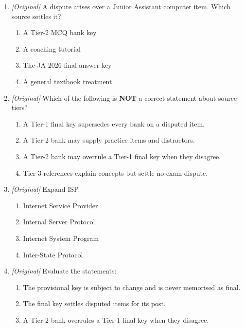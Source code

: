 \documentclass[11pt]{article}
\begin{document}
\begin{enumerate}[label=\textbf{Q\arabic*.}, leftmargin=*]
\begin{enumerate}[label=\Alph*.]
    \item Technical-Post
    \item Version-Sensitive (flag as under-specified)
  \end{enumerate}
\item \textit{[Original]} A dispute arises over a Junior Assistant computer item. Which source settles it?
  \begin{enumerate}[label=\Alph*.]
    \item A Tier-2 MCQ bank key
    \item A coaching tutorial
    \item The JA 2026 final answer key
    \item A general textbook treatment
  \end{enumerate}
\item \textit{[Original]} Which of the following is \textbf{NOT} a correct statement about source tiers?
  \begin{enumerate}[label=\Alph*.]
    \item A Tier-1 final key supersedes every bank on a disputed item.
    \item A Tier-2 bank may supply practice items and distractors.
    \item A Tier-2 bank may overrule a Tier-1 final key when they disagree.
    \item Tier-3 references explain concepts but settle no exam dispute.
  \end{enumerate}
\item \textit{[Original]} Expand ISP.
  \begin{enumerate}[label=\Alph*.]
    \item Internet Service Provider
    \item Internal Server Protocol
    \item Internet System Program
    \item Inter-State Protocol
  \end{enumerate}
\item \textit{[Original]} Evaluate the statements:
  \begin{enumerate}[label=\Roman*.]
    \item The provisional key is subject to change and is never memorised as final.
    \item The final key settles disputed items for its post.
    \item A Tier-2 bank overrules a Tier-1 final key when they disagree.
  \end{enumerate}
  \begin{enumerate}[label=\Alph*.]

\end{enumerate}
\end{enumerate}
\end{document}
